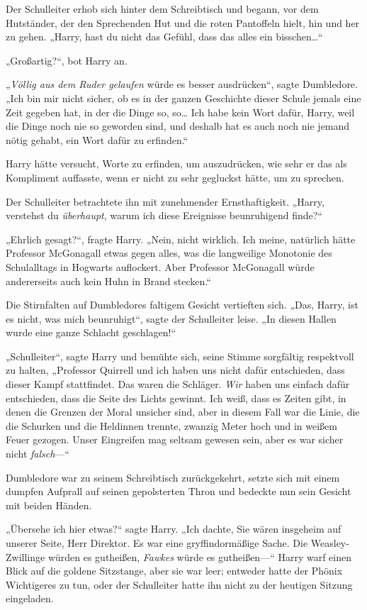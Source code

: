 {Der Schulleiter erhob sich hinter dem Schreibtisch und begann, vor dem Hutständer, der den Sprechenden Hut und die roten Pantoffeln hielt, hin und her zu gehen. „Harry, hast du nicht das Gefühl, dass das alles ein bisschen…“

„Großartig?“, bot Harry an.

„\emph{Völlig aus dem Ruder gelaufen} würde es besser ausdrücken“, sagte Dumbledore. „Ich bin mir nicht sicher, ob es in der ganzen Geschichte dieser Schule jemals eine Zeit gegeben hat, in der die Dinge so, so… Ich habe kein Wort dafür, Harry, weil die Dinge noch nie so geworden sind, und deshalb hat es auch noch nie jemand nötig gehabt, ein Wort dafür zu erfinden.“

Harry hätte versucht, Worte zu erfinden, um auszudrücken, wie sehr er das als Kompliment auffasste, wenn er nicht zu sehr gegluckst hätte, um zu sprechen.

Der Schulleiter betrachtete ihn mit zunehmender Ernsthaftigkeit. „Harry, verstehst du \emph{überhaupt}, warum ich diese Ereignisse beunruhigend finde?“

„Ehrlich gesagt?“, fragte Harry. „Nein, nicht wirklich. Ich meine, natürlich hätte Professor McGonagall etwas gegen alles, was die langweilige Monotonie des Schulalltags in Hogwarts auflockert. Aber Professor McGonagall würde andererseits auch kein Huhn in Brand stecken.“

Die Stirnfalten auf Dumbledores faltigem Gesicht vertieften sich. „Das, Harry, ist es nicht, was mich beunruhigt“, sagte der Schulleiter leise. „In diesen Hallen wurde eine ganze Schlacht geschlagen!“

„Schulleiter“, sagte Harry und bemühte sich, seine Stimme sorgfältig respektvoll zu halten, „Professor Quirrell und ich haben uns nicht dafür entschieden, dass dieser Kampf stattfindet. Das waren die Schläger. \emph{Wir} haben uns einfach dafür entschieden, dass die Seite des Lichts gewinnt. Ich weiß, dass es Zeiten gibt, in denen die Grenzen der Moral unsicher sind, aber in diesem Fall war die Linie, die die Schurken und die Heldinnen trennte, zwanzig Meter hoch und in weißem Feuer gezogen. Unser Eingreifen mag seltsam gewesen sein, aber es war sicher nicht \emph{falsch}—“

Dumbledore war zu seinem Schreibtisch zurückgekehrt, setzte sich mit einem dumpfen Aufprall auf seinen gepolsterten Thron und bedeckte nun sein Gesicht mit beiden Händen.

„Übersehe ich hier etwas?“ sagte Harry. „Ich dachte, Sie wären insgeheim auf unserer Seite, Herr Direktor. Es war eine gryffindormäßige Sache. Die Weasley-Zwillinge würden es gutheißen, \emph{Fawkes} würde es gutheißen—“ Harry warf einen Blick auf die goldene Sitzstange, aber sie war leer; entweder hatte der Phönix Wichtigeres zu tun, oder der Schulleiter hatte ihn nicht zu der heutigen Sitzung eingeladen.

}
